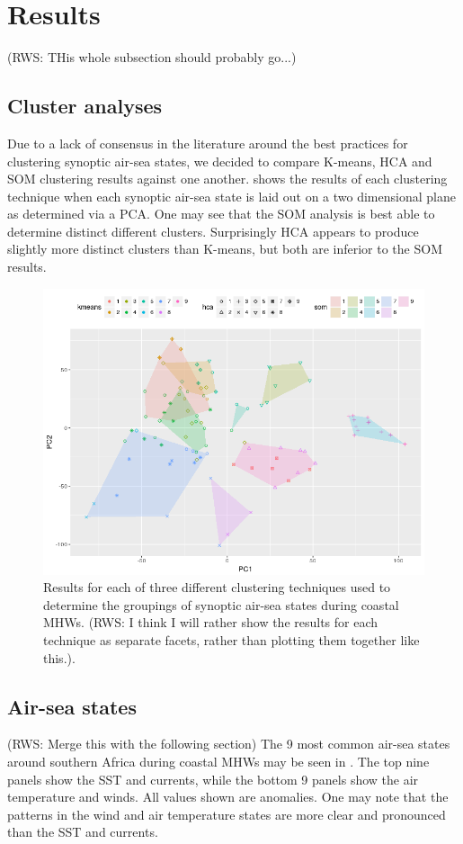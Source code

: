 \documentclass[a4paper,10pt,review]{elsarticle}
\begin{document}
\section{Results}
(RWS: THis whole subsection should probably go...)
\subsection{Cluster analyses}
Due to a lack of consensus in the literature around the best practices for clustering synoptic air-sea states, we decided to compare K-means, HCA and SOM clustering results against one another.  shows the results of each clustering technique when each synoptic air-sea state is laid out on a two dimensional plane as determined via a PCA. One may see that the SOM analysis is best able to determine distinct different clusters. Surprisingly HCA appears to produce slightly more distinct clusters than K-means, but both are inferior to the SOM results.

\begin{figure}
\includegraphics[width=1.0\textwidth]{figure_3.png}
\caption{Results for each of three different clustering techniques used to determine the groupings of synoptic air-sea states during coastal MHWs. (RWS: I think I will rather show the results for each technique as separate facets, rather than plotting them together like this.).}
\label{figure3}
\end{figure}

\subsection{Air-sea states}
(RWS: Merge this with the following section)
The 9 most common air-sea states around southern Africa during coastal MHWs may be seen in . The top nine panels show the SST and currents, while the bottom 9 panels show the air temperature and winds. All values shown are anomalies. One may note that the patterns in the wind and air temperature states are more clear and pronounced than the SST and currents.
\end{document}
